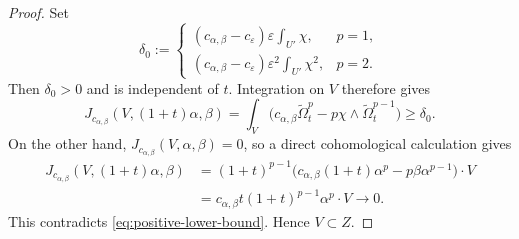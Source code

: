 \documentclass[reqno]{amsart}
\theoremstyle{remark}
\theoremstyle{plain}
\begin{document}
\begin{proof}
Set
\[
 \delta_0:=
 \begin{cases}
 (c_{\alpha,\beta}-c_\varepsilon)\varepsilon\displaystyle\int_{U'}\chi,
       &p=1,\\[3mm]
 (c_{\alpha,\beta}-c_\varepsilon)\varepsilon^2\displaystyle\int_{U'}\chi^2,
       &p=2.
 \end{cases}
\]
Then $\delta_0>0$ and is independent of $t$. 
 Integration on $V$ therefore gives 
\begin{equation}\label{eq:positive-lower-bound}
 J_{c_{\alpha,\beta}}(V,(1+t)\alpha,\beta)
 =\int_V\bigl(c_{\alpha,\beta}\widetilde\Omega_t^p
     -p\chi\wedge\widetilde\Omega_t^{p-1}\bigr)\geq \delta_0. 
\end{equation}
On the other hand, $J_{c_{\alpha,\beta}}(V,\alpha,\beta)=0$, so a direct
cohomological calculation gives
\[
\begin{aligned}
 J_{c_{\alpha,\beta}}(V,(1+t)\alpha,\beta)
 &=(1+t)^{p-1}
   \bigl(c_{\alpha,\beta}(1+t)\alpha^p-p\beta\alpha^{p-1}\bigr)\cdot V\\
 &=c_{\alpha,\beta}t(1+t)^{p-1}\alpha^p\cdot V
 \longrightarrow0.
\end{aligned}
\]
This contradicts \eqref{eq:positive-lower-bound}.  Hence $V\subset Z$.
\end{proof}
\end{document}
